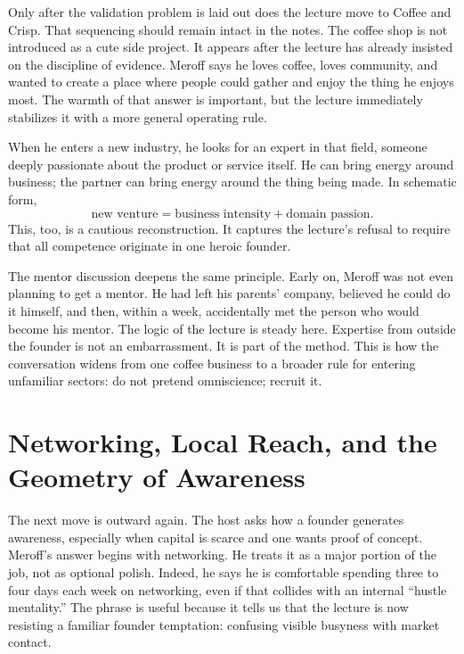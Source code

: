 Only after the validation problem is laid out does the lecture move to Coffee and Crisp. That sequencing should remain intact in the notes. The coffee shop is not introduced as a cute side project. It appears after the lecture has already insisted on the discipline of evidence. Meroff says he loves coffee, loves community, and wanted to create a place where people could gather and enjoy the thing he enjoys most. The warmth of that answer is important, but the lecture immediately stabilizes it with a more general operating rule.

When he enters a new industry, he looks for an expert in that field, someone deeply passionate about the product or service itself. He can bring energy around business; the partner can bring energy around the thing being made. In schematic form,
\begin{equation}
\text{new venture}
=
\text{business intensity}
+
\text{domain passion}.
\end{equation}
This, too, is a cautious reconstruction. It captures the lecture's refusal to require that all competence originate in one heroic founder.

The mentor discussion deepens the same principle. Early on, Meroff was not even planning to get a mentor. He had left his parents' company, believed he could do it himself, and then, within a week, accidentally met the person who would become his mentor. The logic of the lecture is steady here. Expertise from outside the founder is not an embarrassment. It is part of the method. This is how the conversation widens from one coffee business to a broader rule for entering unfamiliar sectors: do not pretend omniscience; recruit it.

\section{Networking, Local Reach, and the Geometry of Awareness}

The next move is outward again. The host asks how a founder generates awareness, especially when capital is scarce and one wants proof of concept. Meroff's answer begins with networking. He treats it as a major portion of the job, not as optional polish. Indeed, he says he is comfortable spending three to four days each week on networking, even if that collides with an internal ``hustle mentality.'' The phrase is useful because it tells us that the lecture is now resisting a familiar founder temptation: confusing visible busyness with market contact.

